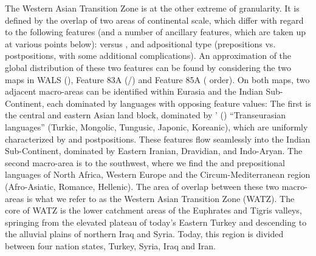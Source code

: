 \documentclass[output=paper,colorlinks,citecolor=brown,collectionchapter]{langscibook}
\begin{document}
The Western Asian Transition Zone is at the other extreme of granularity. It is defined by the overlap of two areas of continental scale, which differ with regard to the following features (and a number of ancillary features, which are taken up at various points below):  versus  , and adpositional type (prepositions vs. postpositions, with some additional complications). An approximation of the global distribution of these two features can be found by considering the two maps in WALS (\citealt{dryer_order_2013_APNP,dryer_order_2013_OV}), Feature 83A (/) and Feature 85A ( order). On both maps, two adjacent macro-areas can be identified within Eurasia and the Indian Sub-Continent, each dominated by languages with opposing feature values: The first is the central and eastern Asian land block, dominated by \citeauthor{robbeets_transeurasian_2017}' (\citeyear{robbeets_transeurasian_2017}) ``Transeurasian languages'' (Turkic, Mongolic, Tungusic, Japonic, Koreanic), which are uniformly characterized by  and postpositions. These features flow seamlessly into the Indian Sub-Continent, dominated by Eastern Iranian, Dravidian, and Indo-Aryan. The second macro-area is to the southwest, where we find the  and prepositional languages of North Africa, Western Europe and the Circum-Mediterranean region (Afro-Asiatic, Romance, Hellenic). The area of overlap between these two macro-areas is what we refer to as the Western Asian Transition Zone (WATZ). The core of WATZ is the lower catchment areas of the Euphrates and Tigris valleys, springing from the elevated plateau of today's Eastern Turkey and descending to the alluvial plains of northern Iraq and Syria. Today, this region is divided between four nation states, Turkey, Syria, Iraq and Iran. 
\end{document}
